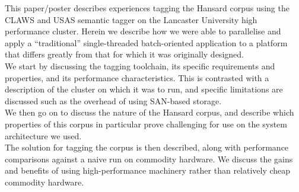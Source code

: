     This paper/poster describes experiences tagging the Hansard corpus using the CLAWS and USAS semantic tagger on the Lancaster University high performance cluster.  Herein we describe how we were able to parallelise and apply a ``traditional'' single-threaded batch-oriented application to a platform that differs greatly from that for which it was originally designed.\\
    We start by discussing the tagging toolchain, its specific requirements and properties, and its performance characteristics.  This is contrasted with a description of the cluster on which it was to run, and specific limitations are discussed such as the overhead of using SAN-based storage.\\
    We then go on to discuss the nature of the Hansard corpus, and describe which properties of this corpus in particular prove challenging for use on the system architecture we used.\\
    The solution for tagging the corpus is then described, along with performance comparisons against a naive run on commodity hardware.  We discuss the gains and benefits of using high-performance machinery rather than relatively cheap commodity hardware.
